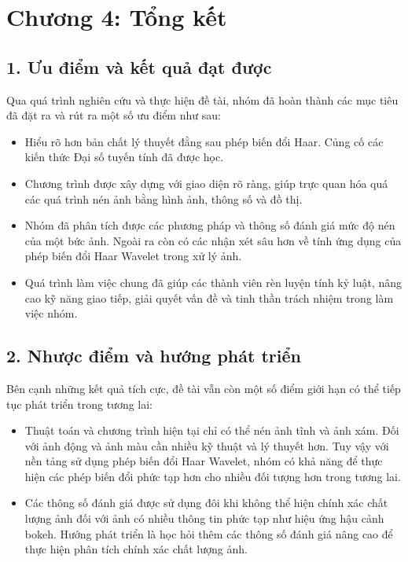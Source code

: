 \section*{Chương 4: Tổng kết}

\subsection*{1. Ưu điểm và kết quả đạt được}
Qua quá trình nghiên cứu và thực hiện đề tài, nhóm đã hoàn thành các mục tiêu đã đặt ra và rút ra một số ưu điểm như sau:
\begin{itemize}
    \item Hiểu rõ hơn bản chất lý thuyết đằng sau phép biến đổi Haar. Củng cố các kiến thức Đại số tuyến tính đã được học.
    \item Chương trình được xây dựng với giao diện rõ ràng, giúp trực quan hóa quá các quá trình nén ảnh bằng hình ảnh, thông số và đồ thị.
    \item Nhóm đã phân tích được các phương pháp và thông số đánh giá mức độ nén của một bức ảnh. Ngoài ra còn có các nhận xét sâu hơn về tính ứng dụng của phép biến đổi Haar Wavelet trong xử lý ảnh.
    \item Quá trình làm việc chung đã giúp các thành viên rèn luyện tính kỷ luật, nâng cao kỹ năng giao tiếp, giải quyết vấn đề và tinh thần trách nhiệm trong làm việc nhóm.
\end{itemize}
\subsection*{2. Nhược điểm và hướng phát triển}
Bên cạnh những kết quả tích cực, đề tài vẫn còn một số điểm giới hạn có thể tiếp tục phát triển trong tương lai:
\begin{itemize}
    \item Thuật toán và chương trình hiện tại chỉ có thể nén ảnh tĩnh và ảnh xám. Đối với ảnh động và ảnh màu cần nhiều kỹ thuật và lý thuyết hơn. 
    Tuy vậy với nền tảng sử dụng phép biến đổi Haar Wavelet, nhóm có khả năng để thực hiện các phép biến đổi phức tạp hơn cho nhiều đối tượng hơn trong tương lai.
    \item Các thông số đánh giá được sử dụng đôi khi không thể hiện chính xác chất lượng ảnh đối với ảnh có nhiều thông tin phức tạp như hiệu ứng hậu cảnh bokeh. Hướng phát triển là 
    học hỏi thêm các thông số đánh giá nâng cao để thực hiện phân tích chính xác chất lượng ảnh.
\end{itemize}